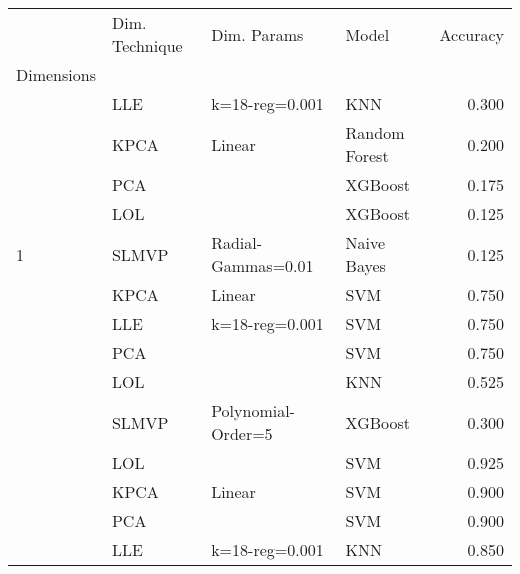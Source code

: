 \begin{table}
    \begin{tabular}{llllr}
        \toprule
        {}                                       & Dim. Technique & Dim. Params        & Model         & Accuracy \\
        Dimensions                               &                &                    &               &          \\
        \midrule
                                                 & LLE            & k=18-reg=0.001     & KNN           & 0.300    \\
                                                 & KPCA           & Linear             & Random Forest & 0.200    \\
                                                 & PCA            &                    & XGBoost       & 0.175    \\
                                                 & LOL            &                    & XGBoost       & 0.125    \\
        \multirow{-5}{*}{1}                      & SLMVP          & Radial-Gammas=0.01 & Naive Bayes   & 0.125    \\
        \rowcolor{lightgray}                     & KPCA           & Linear             & SVM           & 0.750    \\
        \rowcolor{lightgray}                     & LLE            & k=18-reg=0.001     & SVM           & 0.750    \\
        \rowcolor{lightgray}                     & PCA            &                    & SVM           & 0.750    \\
        \rowcolor{lightgray}                     & LOL            &                    & KNN           & 0.525    \\
        \rowcolor{lightgray}\multirow{-5}{*}{3}  & SLMVP          & Polynomial-Order=5 & XGBoost       & 0.300    \\
                                                 & LOL            &                    & SVM           & 0.925    \\
                                                 & KPCA           & Linear             & SVM           & 0.900    \\
                                                 & PCA            &                    & SVM           & 0.900    \\
                                                 & LLE            & k=18-reg=0.001     & KNN           & 0.850    \\

\end{tabular}
\end{table}
